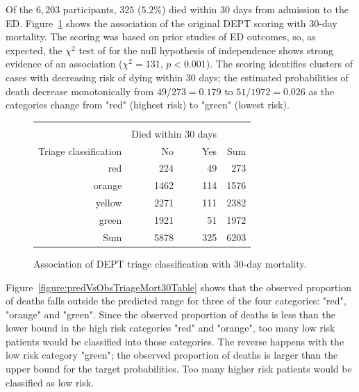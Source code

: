 Of the $6,203$ participants, $325$ ($5.2\%$) died within 30 days from admission to the ED.  Figure~\ref{figure:triageMort30Table} shows the association of the original DEPT scoring with 30-day mortality.   The scoring was based on prior studies of ED outcomes, so, as expected, the $\chi^2$ test of for the null hypothesis of independence shows strong evidence of an association ($\chi^2 = 131$, $p < 0.001$).  The scoring identifies clusters of cases with decreasing risk of dying within 30 days; the estimated probabilities of death decrease monotonically from $ 49/273 =  0.179$ to $ 51/1972 = 0.026$ as the categories change from "red" (highest risk) to "green" (lowest risk).

\begin{figure}[ht]
\centering
\begin{tabular}{rrrr}
  \hline \\
  & \multicolumn{2}{c}{Died within 30 days} & \\
Triage classification & No & Yes & Sum \\
  \hline
red & 224 & 49 & 273 \\
  orange & 1462 & 114 & 1576 \\
  yellow & 2271 & 111 & 2382 \\
  green & 1921 & 51 & 1972 \\
  Sum & 5878 & 325 & 6203 \\
   \hline
\end{tabular}
\caption{Association of DEPT triage classification with
       30-day mortality.}
\label{figure:triageMort30Table}
\end{figure}

Figure~\ref{figure:predVsObsTriageMort30Table} shows that the observed proportion of deaths falls outside the predicted range for three of the four categories: "red", "orange" and "green".  Since the observed proportion of deaths is less than the lower bound in the high risk categories "red" and "orange", too many low risk patients would be classified into those categories.  The reverse happens with the low risk category "green"; the observed proportion of deaths is larger than the upper bound for the target probabilities.  Too many higher risk patients would be classified as low risk.


